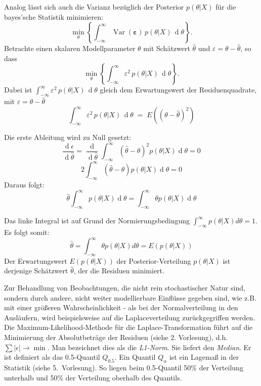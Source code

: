Analog lässt sich auch die Varianz bezüglich der Posterior $p(\theta|X)$ für die bayes'sche Statistik minimieren:
\begin{equation}
\min_{\theta} \left\{ \int_{-\infty}^{\infty} \operatorname{Var}(\boldsymbol \varepsilon)  \, p(\theta|X) \, \operatorname d \theta \right\} .
\end{equation}
Betrachte einen skalaren Modellparameter $\theta$ mit Schätzwert $\hat \theta$ und $\varepsilon = \theta - \hat \theta$, so dass
\begin{equation}
\min_{\theta} \left\{ \int_{-\infty}^{\infty} \varepsilon^2  \, p(\theta|X) \, \operatorname d \theta \right\} .
\end{equation}
Dabei ist $\int_{-\infty}^{\infty} \varepsilon^2  \, p(\theta|X) \, \operatorname d \theta$ gleich dem Erwartungswert der 
Residuenquadrate, mit $\varepsilon = \theta - \hat \theta$
$$
\int_{-\infty}^{\infty} \varepsilon^2  \, p(\theta|X) \, \operatorname d \theta \;
= \; E( (\theta - \hat \theta)^2 )
$$

Die erste Ableitung wird zu Null gesetzt:
\begin{equation}  
\frac{\operatorname d \epsilon}{\operatorname d \hat\theta } = \frac{\operatorname d}{\operatorname d \hat\theta } \int_{-\infty}^{\infty}
(\hat\theta - \theta)^2 p(\theta|X) \operatorname d\theta = 0 
\end{equation}
\[
2 \int_{-\infty}^{\infty} (\hat\theta - \theta) p(\theta|X) \operatorname d\theta = 0
\]
Daraus folgt: 
\[
\hat\theta \int_{-\infty}^{\infty} p(\theta|X) \operatorname d\theta = \int_{-\infty}^{\infty} \theta p(\theta|X) \operatorname d \theta
\]

Das linke Integral ist auf Grund der Normierungsbedingung $\int_{-\infty}^{\infty} p(\theta|X) d\theta = 1$. Es folgt somit: 
\begin{equation}
\hat\theta = \int_{-\infty}^{\infty} \theta p(\theta|X) d \theta = E(p(\theta|X))
\end{equation}
Der Erwartungswert $E(p(\theta|X))$ der Posterior-Verteilung $p(\theta|X)$ ist derjenige Schätzwert
$\hat{\theta}$, der die Residuen minimiert. 


Zur Behandlung von Beobachtungen, die nicht rein stochastischer Natur sind, sondern durch andere, nicht weiter
modellierbare Einflüsse gegeben sind, wie z.B. mit einer größeren Wahrscheinlichkeit - als bei der Normalverteilung in den
Ausläufern, wird beispielsweise auf die Laplaceverteilung zurückgegriffen werden. Die Maximum-Likelihood-Methode für die Laplace-Transformation führt auf die Minimierung der Absolutbeträge der Residuen (siehe 2. Vorlesung),
d.h. $\sum \left|\epsilon \right| \rightarrow \min$. Man bezeichnet dies
als die \textit{L1-Norm}. Sie liefert den \textit{Median}. Er ist 
definiert als das 0.5-Quantil $Q_{0.5}$. Ein Quantil $Q_\alpha$ ist ein Lagemaß in der Statistik (siehe 5.~Vorlesung). So liegen beim 0.5-Quantil 50\% der Verteilung unterhalb und 50\% der Verteilung oberhalb des Quantils.

